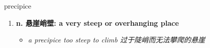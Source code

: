 
\begin{frame}
{\huge precipice}
\begin{center}
\begin{enumerate}\Large
  \item \textbf{n. 悬崖峭壁: a very steep or overhanging place}
  \begin{itemize}
    \item \em{\Large{a precipice too steep to climb 过于陡峭而无法攀爬的悬崖}}
  \end{itemize}
\end{enumerate}
\end{center}
\end{frame}
